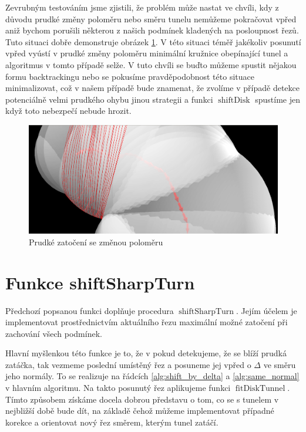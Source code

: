 Zevrubným testováním jsme zjistili, že problém může nastat ve chvíli, kdy
z důvodu prudké změny poloměru nebo směru tunelu nemůžeme pokračovat vpřed aniž
bychom porušili některou z našich podmínek kladených na posloupnost řezů.
Tuto situaci dobře demonstruje obrázek \ref{fig:sharp_curve}. V této situaci
téměř jakékoliv posunutí vpřed vyústí v prudké změny poloměru minimální kružnice
obepínající tunel a algoritmus v tomto případě selže. V tuto chvíli se buďto
můžeme spustit nějakou formu backtrackingu nebo se pokusíme pravděpodobnost
této situace minimalizovat, což v našem případě bude znamenat, že zvolíme v případě
detekce potenciálně velmi prudkého ohybu jinou strategii a funkci
$ \operatorname{shiftDisk} $ spustíme jen když toto nebezpečí nebude hrozit.

\begin{figure}[ht]
    \centering
    \includegraphics[width=\textwidth]{img/sharp_curve.png}
    \caption{Prudké zatočení se změnou poloměru}
  \centering
  \label{fig:sharp_curve}
\end{figure}





\section{Funkce shiftSharpTurn} \label{subsec:shift_sharp_turn}
Předchozí popsanou funkci doplňuje procedura $ \operatorname{shiftSharpTurn} $.
Jejím účelem je implementovat prostřednictvím aktuálního řezu maximální možné
zatočení při zachování všech podmínek.

Hlavní myšlenkou této funkce je to, že v pokud detekujeme, že se blíží prudká
zatáčka, tak vezmeme poslední umístěný řez a posuneme jej vpřed o $ \Delta $ ve směru
jeho normály. To se realizuje na řádcích \ref{alg:shift_by_delta} a
\ref{alg:same_normal} v hlavním algoritmu. Na takto posunutý řez aplikujeme
funkci $ \operatorname{fitDiskTunnel} $. Tímto způsobem získáme docela dobrou
představu o tom, co se s tunelem v nejbližší době bude dít, na základě čehož
můžeme implementovat případné korekce a orientovat nový řez směrem, kterým
tunel zatáčí.

